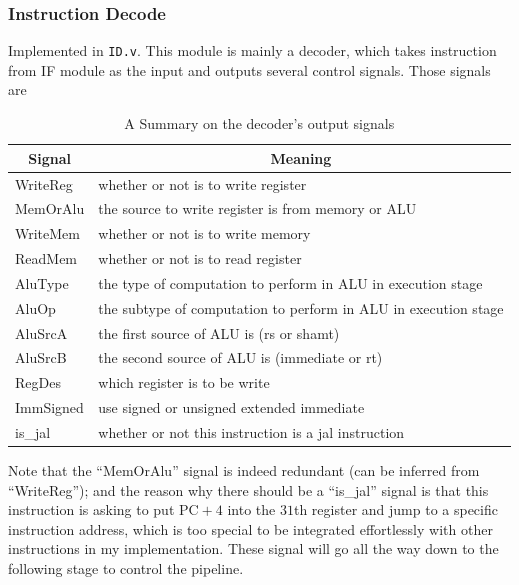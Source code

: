\documentclass[paper=a4, fontsize=11pt]{scrartcl} %
\numberwithin{equation}{section} %
\numberwithin{figure}{section} %
\numberwithin{table}{section} %
\begin{document}
\begin{spacing}{1.5}
    	\subsubsection{Instruction Decode} Implemented in \verb|ID.v|. This module is mainly a decoder, which takes instruction from IF module as the input and outputs several control signals. Those signals are
    		\begin{table}[!htb]
				\centering
				\begin{tabular}{|l|l|}
				\hline
				\multicolumn{1}{|c|}{Signal} & \multicolumn{1}{c|}{Meaning}                                    \\ \hline
				WriteReg                     & whether or not is to write register                             \\ \hline
				MemOrAlu                     & the source to write register is from memory or ALU              \\ \hline
				WriteMem                     & whether or not is to write memory                               \\ \hline
				ReadMem                      & whether or not is to read register                              \\ \hline
				AluType                      & the type of computation to perform in ALU in execution stage    \\ \hline
				AluOp                        & the subtype of computation to perform in ALU in execution stage \\ \hline
				AluSrcA                      & the first source of ALU is (rs or shamt)                        \\ \hline
				AluSrcB                      & the second source of ALU is (immediate or rt)                   \\ \hline
				RegDes                       & which register is to be write                                   \\ \hline
				ImmSigned                    & use signed or unsigned extended immediate                       \\ \hline
				is\_jal                      & whether or not this instruction is a jal instruction            \\ \hline
				\end{tabular}
				\caption{A Summary on the decoder's output signals}
			\end{table}
			
			Note that the ``MemOrAlu'' signal is indeed redundant (can be inferred from ``WriteReg''); and the reason why there should be a ``is\_jal'' signal is that this instruction is asking to put $\mathrm{PC}+4$ into the $31$th register and jump to a specific instruction address, which is too special to be integrated effortlessly with other instructions in my implementation. These signal will go all the way down to the following stage to control the pipeline. 
			

\end{spacing}
\end{document}
